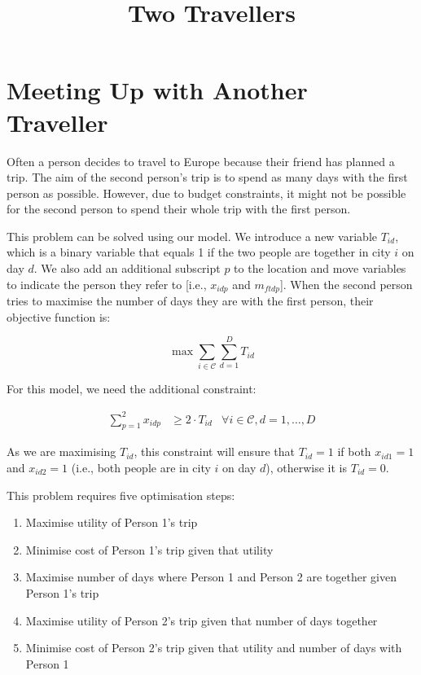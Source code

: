 \documentclass[12pt]{article}
\title{Two Travellers}
\author{}
\date{}
\begin{document}
\maketitle

\section{Meeting Up with Another Traveller}

Often a person decides to travel to Europe because their friend has planned a trip. The aim of the second person's trip is to spend as many days with the first person as possible. However, due to budget constraints, it might not be possible for the second person to spend their whole trip with the first person.

This problem can be solved using our model. We introduce a new variable $T_{id}$, which is a binary variable that equals 1 if the two people are together in city $i$ on day $d$. We also add an additional subscript $p$ to the location and move variables to indicate the person they refer to [i.e., $x_{idp}$ and $m_{ftdp}$]. When the second person tries to maximise the number of days they are with the first person, their objective function is:

\begin{equation*}
	\max \sum_{i \in \mathcal{C}} \sum_{d = 1}^{D} T_{id}
\end{equation*}

For this model, we need the additional constraint:

\begin{align}
	\sum_{p = 1}^{2} x_{idp} & \geq 2 \cdot T_{id} & \forall i \in \mathcal{C}, d = 1, \ldots, D
\end{align}

As we are maximising $T_{id}$, this constraint will ensure that $T_{id} = 1$ if both $x_{id1} = 1$ and $x_{id2} = 1$ (i.e., both people are in city $i$ on day $d$), otherwise it is $T_{id} = 0$.

This problem requires five optimisation steps:

\begin{enumerate}
	\item Maximise utility of Person 1's trip
	\item Minimise cost of Person 1's trip given that utility
	\item Maximise number of days where Person 1 and Person 2 are together given Person 1's trip
	\item Maximise utility of Person 2's trip given that number of days together
	\item Minimise cost of Person 2's trip given that utility and number of days with Person 1
\end{enumerate}
\end{document}
